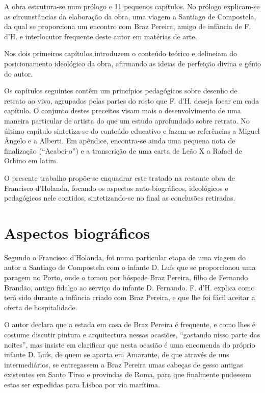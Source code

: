 \documentclass{article}
\begin{document}
A obra estrutura-se num prólogo e 11 pequenos capítulos. No prólogo
explicam-se as circunstâncias da elaboração da obra, uma viagem a
Santiago de Compostela, da qual se proporciona um encontro com Braz
Pereira, amigo de infância de F. d'H. e interlocutor frequente deste
autor em matérias de arte.

Nos dois primeiros capítulos introduzem o conteúdo teórico e delineiam
do posicionamento ideológico da obra, afirmando as ideias de perfeição
divina e génio do autor.

Os capítulos seguintes contêm um princípios pedagógicos sobre desenho
de retrato ao vivo, agrupados pelas partes do rosto que F. d'H. deseja
focar em cada capítulo. O conjunto destes preceitos visam mais o
desenvolvimento de uma maneira particular de artista do que um estudo
aprofundado sobre retrato. No último capítulo sintetiza-se do conteúdo
educativo e fazem-se referências a Miguel Ângelo e a Alberti. Em
apêndice, encontra-se ainda uma pequena nota de finalização
(``Acabei-o'') e a transcrição de uma carta de Leão X a Rafael de
Orbino em latim.

O presente trabalho propõe-se enquadrar este tratado na restante obra
de Francisco d'Holanda, focando os aspectos auto-biográficos,
ideológicos e pedagógicos nele contidos, sintetizando-se no final as
conclusões retiradas.

\section{Aspectos biográficos}

Segundo o Francisco d'Holanda, foi numa particular etapa de uma viagem
do autor a Santiago de Compostela com o infante D. Luís que se
proporcionou uma paragem no Porto, onde o tomou por hóspede Braz
Pereira, filho de Fernando Brandão, antigo fidalgo ao serviço do
infante D. Fernando. F. d'H. explica como terá sido durante a infância
criado com Braz Pereira, e que lhe foi fácil aceitar a oferta de
hospitalidade.

O autor declara que a estada em casa de Braz Pereira é frequente, e
como lhes é costume discutir pintura e arquitectura nessas ocasiões,
``gastando nisso parte das noites'', mas insiste em clarificar que
nesta ocasião é uma encomenda do próprio infante D. Luís, de quem se
aparta em Amarante, de que através de uns intermediários, se
entregassem a Braz Pereira umas cabeças de gesso antigas existentes em
Santo Tirso e provindas de Roma, para que finalmente pudessem estas
ser expedidas para Lisboa por via marítima.
\end{document}

